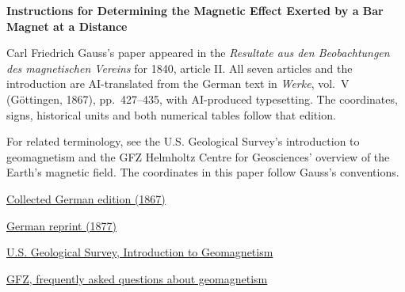 \clearpage
\thispagestyle{empty}
\begin{center}\Large\textbf{Instructions for Determining the Magnetic Effect Exerted by a Bar Magnet at a Distance}\end{center}

Carl Friedrich Gauss’s paper appeared in the \textit{Resultate aus den Beobachtungen des magnetischen Vereins} for 1840, article II. All seven articles and the introduction are AI-translated from the German text in \textit{Werke}, vol.~V (Göttingen, 1867), pp.~427--435, with AI-produced typesetting. The coordinates, signs, historical units and both numerical tables follow that edition.

\medskip\noindent
For related terminology, see the U.S. Geological Survey’s introduction to geomagnetism and the GFZ Helmholtz Centre for Geosciences’ overview of the Earth's magnetic field. The coordinates in this paper follow Gauss’s conventions.

\medskip\noindent
\href{https://gdz.sub.uni-goettingen.de/id/PPN236006339}{Collected German edition (1867)}\par
\noindent\href{https://doi.org/10.1007/978-3-642-49319-5_20}{German reprint (1877)}\par
\noindent\href{https://www.usgs.gov/programs/geomagnetism/introduction-geomagnetism}{U.S. Geological Survey, Introduction to Geomagnetism}\par
\noindent\href{https://www.gfz.de/sektion/geomagnetismus/daten-produkte-dienste/haeufig-gestellte-fragen-zum-thema-erdmagnetismus}{GFZ, frequently asked questions about geomagnetism}
\clearpage
